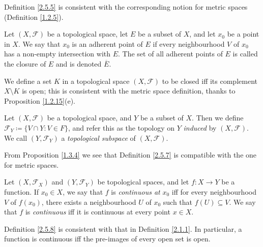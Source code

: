 \begin{note}
    Definition \ref{2.5.5} is consistent with the corresponding notion for metric spaces (Definition \ref{1.2.5}).
\end{note}

\begin{definition}[Closure]\label{2.5.6}
    Let \((X, \mathcal{F})\) be a topological space, let \(E\) be a subset of \(X\), and let \(x_0\) be a point in \(X\).
    We say that \(x_0\) is an adherent point of \(E\) if every neighbourhood \(V\) of \(x_0\) has a non-empty intersection with \(E\).
    The set of all adherent points of \(E\) is called the closure of \(E\) and is denoted \(\overline{E}\).
\end{definition}

\begin{note}
    We define a set \(K\) in a topological space \((X, \mathcal{F})\) to be closed iff its complement \(X \setminus K\) is open;
    this is consistent with the metric space definition, thanks to Proposition \ref{1.2.15}(e).
\end{note}

\begin{definition}\label{2.5.7}
    Let \((X, \mathcal{F})\) be a topological space, and \(Y\) be a subset of \(X\).
    Then we define \(\mathcal{F}_Y \coloneqq \{V \cap Y : V \in F\}\), and refer this as the topology on \(Y\) \emph{induced} by \((X, \mathcal{F})\).
    We call \((Y, \mathcal{F}_Y)\) a \emph{topological subspace} of \((X, \mathcal{F})\).
\end{definition}

\begin{note}
    From Proposition \ref{1.3.4} we see that Definition \ref{2.5.7} is compatible with the one for metric spaces.
\end{note}

\begin{definition}\label{2.5.8}
    Let \((X, \mathcal{F}_X)\) and \((Y, \mathcal{F}_Y)\) be topological spaces, and let \(f : X \to Y\) be a function.
    If \(x_0 \in X\), we say that \(f\) is \emph{continuous at} \(x_0\) iff for every neighbourhood \(V\) of \(f(x_0)\), there exists a neighbourhood \(U\) of \(x_0\) such that \(f(U) \subseteq V\).
    We say that \(f\) is \emph{continuous} iff it is continuous at every point \(x \in X\).
\end{definition}

\begin{note}
    Definition \ref{2.5.8} is consistent with that in Definition \ref{2.1.1}.
    In particular, a function is continuous iff the pre-images of every open set is open.
\end{note}

